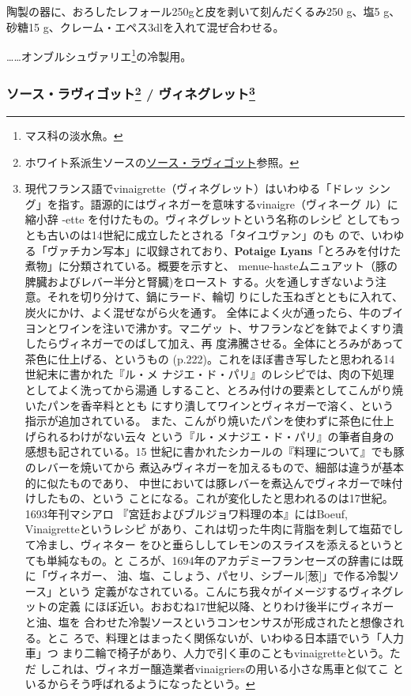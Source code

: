 \begin{recette}
陶製の器に、おろしたレフォール250gと皮を剥いて刻んだくるみ250 g、塩5 g、
砂糖15 g、クレーム・エペス3dlを入れて混ぜ合わせる。

\ldots{}\ldots{}オンブルシュヴァリエ\footnote{マス科の淡水魚。}の冷製用。

\maeaki

\hypertarget{ux30bdux30fcux30b9ux30e9ux30f4ux30a3ux30b4ux30c3ux30c830-ux30f4ux30a3ux30cdux30b0ux30ecux30c3ux30c831}{%
\subsubsection[ソース・ラヴィゴット /
ヴィネグレット]{\texorpdfstring{ソース・ラヴィゴット\footnote{ホワイト系派生ソースの\protect\hyperlink{sauce-ravigote}{ソース・ラヴィゴット}参照。}
/ ヴィネグレット\footnote{現代フランス語でvinaigrette（ヴィネグレット）はいわゆる「ドレッ
  シング」を指す。語源的にはヴィネガーを意味するvinaigre（ヴィネーグ
  ル）に縮小辞 -ette を付けたもの。ヴィネグレットという名称のレシピ
  としてもっとも古いのは14世紀に成立したとされる「タイユヴァン」のも
  ので、いわゆる「ヴァチカン写本」に収録されており、\textbf{Potaige
  Lyans}「とろみを付けた煮物」に分類されている。概要を示すと、
  menue-hasteムニュアット（豚の脾臓およびレバー半分と腎臓)をロースト
  する。火を通しすぎないよう注意。それを切り分けて、鍋にラード、輪切
  りにした玉ねぎとともに入れて、炭火にかけ、よく混ぜながら火を通す。
  全体によく火が通ったら、牛のブイヨンとワインを注いで沸かす。マニゲッ
  ト、サフランなどを鉢でよくすり潰したらヴィネガーでのばして加え、再
  度沸騰させる。全体にとろみがあって茶色に仕上げる、というもの
  (p.222)。これをほぼ書き写したと思われる14世紀末に書かれた『ル・メ
  ナジエ・ド・パリ』のレシピでは、肉の下処理としてよく洗ってから湯通
  しすること、とろみ付けの要素としてこんがり焼いたパンを香辛料ととも
  にすり潰してワインとヴィネガーで溶く、という指示が追加されている。
  また、こんがり焼いたパンを使わずに茶色に仕上げられるわけがない云々
  という『ル・メナジエ・ド・パリ』の筆者自身の感想も記されている。15
  世紀に書かれたシカールの『料理について』でも豚のレバーを焼いてから
  煮込みヴィネガーを加えるもので、細部は違うが基本的に似たものであり、
  中世においては豚レバーを煮込んでヴィネガーで味付けしたもの、という
  ことになる。これが変化したと思われるのは17世紀。1693年刊マシアロ
  『宮廷およびブルジョワ料理の本』にはBoeuf, Vinaigretteというレシピ
  があり、これは切った牛肉に背脂を刺して塩茹でして冷まし、ヴィネター
  をひと垂らししてレモンのスライスを添えるというとても単純なもの。と
  ころが、1694年のアカデミーフランセーズの辞書には既に「ヴィネガー、
  油、塩、こしょう、パセリ、シブール{[}葱{]}」で作る冷製ソース」という
  定義がなされている。こんにち我々がイメージするヴィネグレットの定義
  にほぼ近い。おおむね17世紀以降、とりわけ後半にヴィネガーと油、塩を
  合わせた冷製ソースというコンセンサスが形成されたと想像される。とこ
  ろで、料理とはまったく関係ないが、いわゆる日本語でいう「人力車」つ
  まり二輪で椅子があり、人力で引く車のこともvinaigretteという。ただ
  しこれは、ヴィネガー醸造業者vinaigriersの用いる小さな馬車と似てこ
  といるからそう呼ばれるようになったという。}}{ソース・ラヴィゴット / ヴィネグレット}}\label{ux30bdux30fcux30b9ux30e9ux30f4ux30a3ux30b4ux30c3ux30c830-ux30f4ux30a3ux30cdux30b0ux30ecux30c3ux30c831}}


\end{recette}
